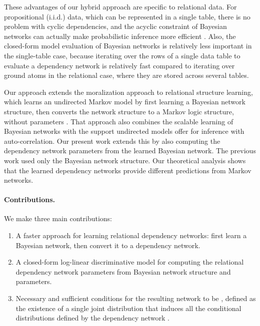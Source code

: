 \documentclass[runningheads,a4paper]{llncs}
\newcommand{\iid}{i.i.d.}
\begin{document}
These advantages  of our hybrid approach are specific to relational data. For propositional (\iid) data, which can be represented in a single table, there is no problem with cyclic dependencies, and the acyclic constraint of Bayesian networks can actually make probabilistic inference more efficient \cite{Hulten2003}. Also, the closed-form model evaluation of Bayesian networks is relatively less important in the single-table case, because iterating over the rows of a single data table to evaluate a dependency network is relatively fast compared to iterating over ground atoms in the relational case, where they are stored across several tables. 

Our approach extends the moralization approach to relational structure learning, which learns an undirected Markov model by first learning a Bayesian network structure, then converts the network structure to a Markov logic structure, without parameters \cite{Khosravi2010,Schulte2012}. That approach also combines the scalable learning of Bayesian networks with the support undirected models offer for inference with auto-correlation. 
Our present work extends this by also computing the dependency network parameters from the learned Bayesian network. The previous work used only the Bayesian network structure. Our theoretical analysis shows that the learned dependency networks provide different predictions from Markov networks. 

\paragraph{Contributions.}

We make three main contributions:
\begin{enumerate}
\item A faster approach for learning relational dependency networks: first learn a Bayesian network, then convert it to a dependency network.
\item A closed-form log-linear discriminative model for computing the relational dependency network parameters from Bayesian network structure and parameters.
\item Necessary and sufficient conditions for the resulting network to be , defined as the existence of a single joint distribution that induces all the conditional distributions defined by the dependency network \cite{Heckerman2000}.
\end{enumerate}
\end{document}
